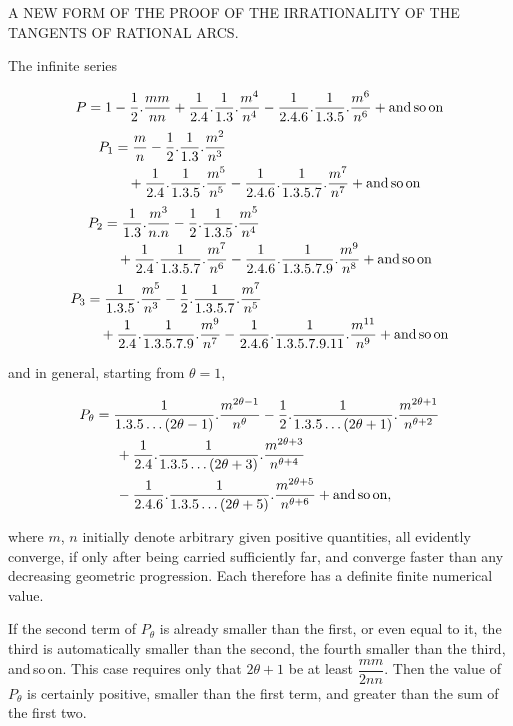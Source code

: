 \clearpage
{}

\begin{center}\large A NEW FORM OF THE PROOF OF THE IRRATIONALITY OF THE TANGENTS OF RATIONAL ARCS.\end{center}

\noindent\hspace*{\parindent}The infinite series

\[
P = 1-\frac{1}{2} . \frac{mm}{nn}+\frac{1}{2.4} . \frac{1}{1.3} . \frac{m^4}{n^4}-\frac{1}{2.4.6} . \frac{1}{1.3.5} . \frac{m^6}{n^6}+\text{and\,so\,on}
\]
\[
\begin{aligned}
P_1 &= \frac{m}{n}-\frac{1}{2} . \frac{1}{1.3} . \frac{m^2}{n^3}\\ &\quad+\frac{1}{2.4} . \frac{1}{1.3.5} . \frac{m^5}{n^5}-\frac{1}{2.4.6} . \frac{1}{1.3.5.7} . \frac{m^7}{n^7}+\text{and\,so\,on}
\end{aligned}
\]
\[
\begin{aligned}
P_2 &= \frac{1}{1.3} . \frac{m^3}{n.n}-\frac{1}{2} . \frac{1}{1.3.5} . \frac{m^5}{n^4}\\ &\quad+\frac{1}{2.4} . \frac{1}{1.3.5.7} . \frac{m^7}{n^6}-\frac{1}{2.4.6} . \frac{1}{1.3.5.7.9} . \frac{m^9}{n^8}+\text{and\,so\,on}
\end{aligned}
\]
\[
\begin{aligned}
P_3 &= \frac{1}{1.3.5} . \frac{m^5}{n^3}-\frac{1}{2} . \frac{1}{1.3.5.7} . \frac{m^7}{n^5}\\ &\quad+\frac{1}{2.4} . \frac{1}{1.3.5.7.9} . \frac{m^9}{n^7}-\frac{1}{2.4.6} . \frac{1}{1.3.5.7.9.11} . \frac{m^{11}}{n^9}+\text{and\,so\,on}
\end{aligned}
\]

\noindent and in general, starting from $\theta = 1$,

\[
\begin{aligned}
P_\theta = {}& \frac{1}{1.3.5\ldots(2\theta-1)} . \frac{m^{2\theta-1}}{n^\theta}
-\frac{1}{2} . \frac{1}{1.3.5\ldots(2\theta+1)} . \frac{m^{2\theta+1}}{n^{\theta+2}}
\\ &\,+\frac{1}{2.4} . \frac{1}{1.3.5\ldots(2\theta+3)} . \frac{m^{2\theta+3}}{n^{\theta+4}}
\\ &\,-\frac{1}{2.4.6} . \frac{1}{1.3.5\ldots(2\theta+5)} . \frac{m^{2\theta+5}}{n^{\theta+6}}+\text{and\,so\,on},
\end{aligned}
\]

\noindent where $m$, $n$ initially denote arbitrary given positive quantities,
all evidently converge, if only after being carried sufficiently far,
and converge faster than any decreasing geometric progression.
Each therefore has a definite finite numerical value.

If the second term of $P_\theta$ is already smaller than the first, or even
equal to it, the third is automatically smaller than the second, the
fourth smaller than the third, and\,so\,on. This case requires only
that $2\theta+1$ be at least $\dfrac{mm}{2nn}$. Then the
value of $P_\theta$ is certainly positive, smaller than the first term, and
greater than the sum of the first two.
